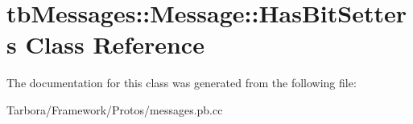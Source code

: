\hypertarget{classtbMessages_1_1Message_1_1HasBitSetters}{}\section{tb\+Messages\+:\+:Message\+:\+:Has\+Bit\+Setters Class Reference}
\label{classtbMessages_1_1Message_1_1HasBitSetters}


The documentation for this class was generated from the following file\+:\begin{DoxyCompactItemize}
\item 
Tarbora/\+Framework/\+Protos/messages.\+pb.\+cc\end{DoxyCompactItemize}
